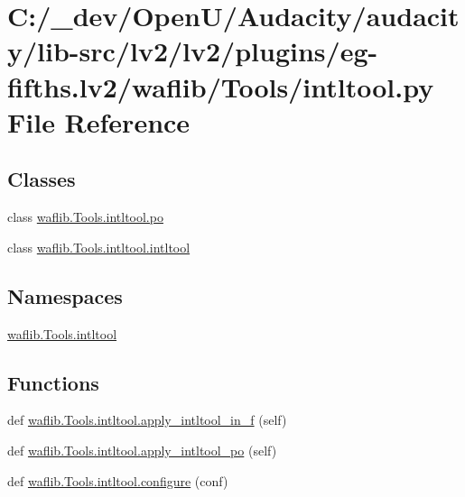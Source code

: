 \hypertarget{lv2_2plugins_2eg-fifths_8lv2_2waflib_2_tools_2intltool_8py}{}\section{C\+:/\+\_\+dev/\+Open\+U/\+Audacity/audacity/lib-\/src/lv2/lv2/plugins/eg-\/fifths.lv2/waflib/\+Tools/intltool.py File Reference}
\label{lv2_2plugins_2eg-fifths_8lv2_2waflib_2_tools_2intltool_8py}
\subsection*{Classes}
\begin{DoxyCompactItemize}
\item 
class \hyperlink{classwaflib_1_1_tools_1_1intltool_1_1po}{waflib.\+Tools.\+intltool.\+po}
\item 
class \hyperlink{classwaflib_1_1_tools_1_1intltool_1_1intltool}{waflib.\+Tools.\+intltool.\+intltool}
\end{DoxyCompactItemize}
\subsection*{Namespaces}
\begin{DoxyCompactItemize}
\item 
 \hyperlink{namespacewaflib_1_1_tools_1_1intltool}{waflib.\+Tools.\+intltool}
\end{DoxyCompactItemize}
\subsection*{Functions}
\begin{DoxyCompactItemize}
\item 
def \hyperlink{namespacewaflib_1_1_tools_1_1intltool_aa64909ee30db7f6c262eb9c6bacc5f08}{waflib.\+Tools.\+intltool.\+apply\+\_\+intltool\+\_\+in\+\_\+f} (self)
\item 
def \hyperlink{namespacewaflib_1_1_tools_1_1intltool_a8e47eb8e5671c4d3f18cdb788a5868b6}{waflib.\+Tools.\+intltool.\+apply\+\_\+intltool\+\_\+po} (self)
\item 
def \hyperlink{namespacewaflib_1_1_tools_1_1intltool_a6e857d8fd69986194be76352936c4db1}{waflib.\+Tools.\+intltool.\+configure} (conf)
\end{DoxyCompactItemize}

